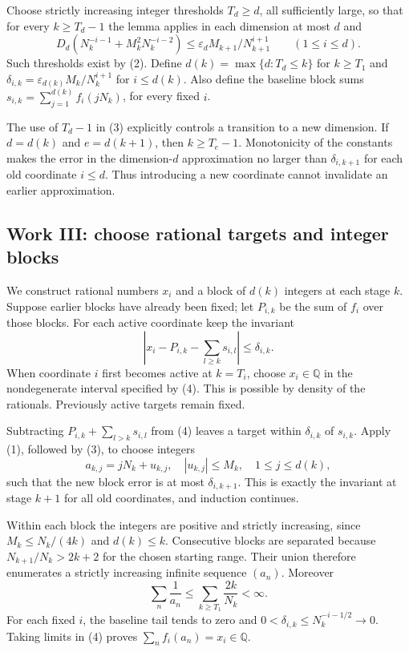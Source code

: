 Choose strictly increasing integer thresholds $T_d\ge d$, all sufficiently large, so that for every $k\ge T_d-1$ the lemma applies in each dimension at most $d$ and
\[
 D_d(N_k^{-i-1}+M_k^2N_k^{-i-2})
 \le\varepsilon_d M_{k+1}/N_{k+1}^{i+1}
 \qquad(1\le i\le d).
 \tag{3}
\]
Such thresholds exist by (2). Define $d(k)=\max\{d:T_d\le k\}$ for $k\ge T_1$ and
$\delta_{i,k}=\varepsilon_{d(k)}M_k/N_k^{i+1}$ for $i\le d(k)$. Also define the baseline block sums
$s_{i,k}=\sum_{j=1}^{d(k)}f_i(jN_k)$, for every fixed $i$.

The use of $T_d-1$ in (3) explicitly controls a transition to a new dimension. If $d=d(k)$ and $e=d(k+1)$, then $k\ge T_e-1$. Monotonicity of the constants makes the error in the dimension-$d$ approximation no larger than $\delta_{i,k+1}$ for each old coordinate $i\le d$. Thus introducing a new coordinate cannot invalidate an earlier approximation.

\subsection{Work III: choose rational targets and integer blocks}
We construct rational numbers $x_i$ and a block of $d(k)$ integers at each stage $k$. Suppose earlier blocks have already been fixed; let $P_{i,k}$ be the sum of $f_i$ over those blocks. For each active coordinate keep the invariant
\[
 \left|x_i-P_{i,k}-\sum_{l\ge k}s_{i,l}\right|\le\delta_{i,k}.
 \tag{4}
\]
When coordinate $i$ first becomes active at $k=T_i$, choose $x_i\in\mathbb Q$ in the nondegenerate interval specified by (4). This is possible by density of the rationals. Previously active targets remain fixed.

Subtracting $P_{i,k}+\sum_{l>k}s_{i,l}$ from (4) leaves a target within $\delta_{i,k}$ of $s_{i,k}$. Apply (1), followed by (3), to choose integers
\[
 a_{k,j}=jN_k+u_{k,j},\quad |u_{k,j}|\le M_k,
 \quad 1\le j\le d(k),
\]
such that the new block error is at most $\delta_{i,k+1}$. This is exactly the invariant at stage $k+1$ for all old coordinates, and induction continues.

Within each block the integers are positive and strictly increasing, since $M_k\le N_k/(4k)$ and $d(k)\le k$. Consecutive blocks are separated because $N_{k+1}/N_k>2k+2$ for the chosen starting range. Their union therefore enumerates a strictly increasing infinite sequence $(a_n)$. Moreover
\[
 \sum_n\frac1{a_n}\le\sum_{k\ge T_1}\frac{2k}{N_k}<\infty.
\]
For each fixed $i$, the baseline tail tends to zero and
$0<\delta_{i,k}\le N_k^{-i-1/2}\to0$. Taking limits in (4) proves
$\sum_n f_i(a_n)=x_i\in\mathbb Q$.

